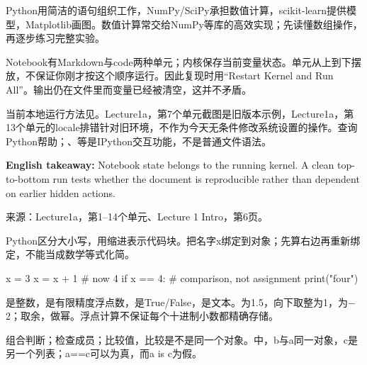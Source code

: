 Python用简洁的语句组织工作，NumPy/SciPy承担数值计算，scikit-learn提供模型，Matplotlib画图。数值计算常交给NumPy等库的高效实现；先读懂数组操作，再逐步练习完整实验。


Notebook有Markdown与code两种单元；内核保存当前变量状态。单元从上到下摆放，不保证你刚才按这个顺序运行。因此复现时用“Restart Kernel and Run All”。输出仍在文件里而变量已经被清空，这并不矛盾。


当前本地运行方法见。Lecture1a，第7个单元截图是旧版本示例，Lecture1a，第13个单元的locale排错针对旧环境，不作为今天无条件修改系统设置的操作。查询Python帮助；、等是IPython交互功能，不是普通文件语法。


\textbf{English takeaway:} Notebook state belongs to the running kernel. A clean top-to-bottom run tests whether the document is reproducible rather than dependent on earlier hidden actions.


来源：Lecture1a，第1–14个单元、Lecture 1 Intro，第6页。








Python区分大小写，用缩进表示代码块。把名字x绑定到对象；先算右边再重新绑定，不能当成数学等式化简。



\begin{StudyCode}
x = 3
x = x + 1       # now 4
if x == 4:      # comparison, not assignment
    print("four")
\end{StudyCode}


是整数，是有限精度浮点数，是True/False，是文本。为1.5，向下取整为1，为\ensuremath{-}2；\StudyInline{\%}取余，\StudyInline{**}做幂。浮点计算不保证每个十进制小数都精确存储。


组合判断；检查成员；\StudyInline{=\allowbreak{}=\allowbreak{}}比较值，比较是不是同一个对象。中，b与a同一对象，c是另一个列表；a==c可以为真，而a is c为假。


